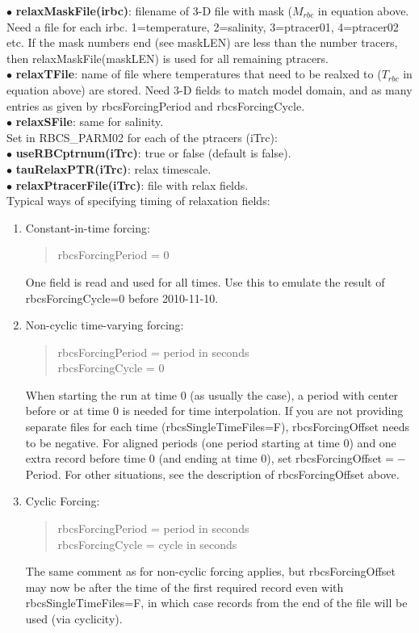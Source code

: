 $\bullet$  {\bf relaxMaskFile(irbc)}: filename of 3-D file
with mask ($M_{rbc}$ in equation above. 
Need a file for each irbc. 1=temperature,
2=salinity, 3=ptracer01, 4=ptracer02 etc. If the mask numbers
end (see maskLEN) are less than the number tracers, then
relaxMaskFile(maskLEN) is used for all remaining ptracers.\\
$\bullet$  {\bf relaxTFile}: name of file where temperatures
that need to be realxed to ($T_{rbc}$ in equation above)
are stored. Need 3-D fields to
match model domain, and as many entries as given by
rbcsForcingPeriod and rbcsForcingCycle.\\
$\bullet$  {\bf relaxSFile}: same for salinity.\\

\vspace{.5cm}
\noindent
Set in {RBCS\_PARM02} for each of the ptracers (iTrc):\\
$\bullet$ {\bf useRBCptrnum(iTrc)}: true or false (default
is false).\\
$\bullet$ {\bf tauRelaxPTR(iTrc)}: relax timescale.\\
$\bullet$ {\bf relaxPtracerFile(iTrc)}: file with relax
fields.\\

\noindent
Typical ways of specifying timing of relaxation fields:
\begin{enumerate}
\item Constant-in-time forcing:
  \begin{quote}
     rbcsForcingPeriod = 0
  \end{quote}
  One field is read and used for all times.  Use this to emulate the result of
  rbcsForcingCycle=0 before 2010-11-10.

\item Non-cyclic time-varying forcing:
  \begin{quote}
     rbcsForcingPeriod = period in seconds\\
     rbcsForcingCycle = 0
  \end{quote}
  When starting the run at time 0 (as usually the case), a period with center before
  or at time 0 is needed for time interpolation.  If you are not providing separate
  files for each time (rbcsSingleTimeFiles=F), rbcsForcingOffset needs to be negative.
  For aligned periods (one period starting at time 0) and one extra record before
  time 0 (and ending at time 0), set rbcsForcingOffset${}=-$Period.
  For other situations, see the description of rbcsForcingOffset above.

\item Cyclic Forcing:
  \begin{quote}
     rbcsForcingPeriod = period in seconds\\
     rbcsForcingCycle = cycle in seconds
  \end{quote}
  The same comment as for non-cyclic forcing applies, but rbcsForcingOffset may now be
  after the time of the first required record even with rbcsSingleTimeFiles=F, in which
  case records from the end of the file will be used (via cyclicity).
\end{enumerate}

